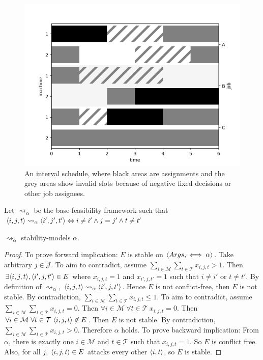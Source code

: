 \begin{figure}[H]
	\begin{center}
		\includegraphics[width=.8\linewidth]{figures/interval.png}	
	\end{center}
	\caption{An interval schedule, where black areas are assignments and the grey areas show invalid slots because of negative fixed decisions or other job assignees.}
\end{figure}

\begin{definition}
	Let $\rightsquigarrow_\alpha$ be the base-feasibility framework such that $\langle{i},{j},{t}\rangle\rightsquigarrow_\alpha\langle{i'},{j'},{t'}\rangle\Leftrightarrow i\neq i'\land j=j'\land t\neq t'$ 
\end{definition}

\begin{lemma}
	\label{stabilityalpha}
	$\rightsquigarrow_\alpha$ stability-models $\alpha$.
	
	\begin{proof}
		To prove forward implication: $E$ is stable on $\langle{Args},{\iff\alpha}\rangle$. Take arbitrary $j\in\mathcal{J}$. To aim to contradict, assume $\sum_{i\in\mathcal{M}}\sum_{t\in\mathcal{T}}x_{i,j,t}>1$. Then $\exists\langle{i},{j},{t}\rangle,\langle{i'},{j},{t'}\rangle\in E$ where $x_{i,j,t}=1$ and $x_{i',j,t'}=1$ such that $i\neq i'$ or $t\neq t'$. By definition of $\rightsquigarrow_\alpha$, $\langle{i},{j},{t}\rangle\rightsquigarrow_\alpha\langle{i'},{j},{t'}\rangle$. Hence $E$ is not conflict-free, then $E$ is not stable. By contradiction, $\sum_{i\in\mathcal{M}}\sum_{t\in\mathcal{T}}x_{i,j,t}\leq 1$. To aim to contradict, assume $\sum_{i\in\mathcal{M}}\sum_{t\in\mathcal{T}}x_{i,j,t}=0$. Then $\forall i\in\mathcal{M}\ \forall t\in\mathcal{T}\ x_{i,j,t}=0$. Then $\forall i\in\mathcal{M}\ \forall t\in\mathcal{T}\ \langle{i},{j},{t}\rangle\not\in E$. Then $E$ is not stable. By contradiction, $\sum_{i\in\mathcal{M}}\sum_{t\in\mathcal{T}}x_{i,j,t}>0$. Therefore $\alpha$ holds.
		\linespace
		To prove backward implication: From $\alpha$, there is exactly one $i\in\mathcal{M}$ and $t\in\mathcal{T}$ such that $x_{i,j,t}=1$. So $E$ is conflict free. Also, for all $j$, $\langle{i},{j},{t}\rangle\in E$ attacks every other $\langle{i},{t}\rangle$, so $E$ is stable.
	\end{proof}
\end{lemma}

